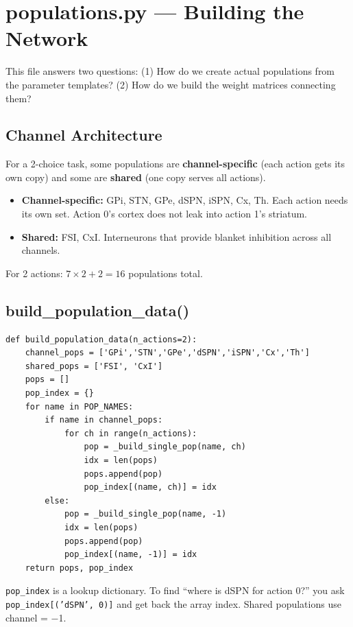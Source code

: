 \documentclass[11pt,a4paper]{article}
\begin{document}
\section{populations.py --- Building the Network}

This file answers two questions: (1) How do we create actual populations from the parameter templates? (2) How do we build the weight matrices connecting them?

\subsection{Channel Architecture}

For a 2-choice task, some populations are \textbf{channel-specific} (each action gets its own copy) and some are \textbf{shared} (one copy serves all actions).

\begin{itemize}
    \item \textbf{Channel-specific:} GPi, STN, GPe, dSPN, iSPN, Cx, Th. Each action needs its own set. Action 0's cortex does not leak into action 1's striatum.
    \item \textbf{Shared:} FSI, CxI. Interneurons that provide blanket inhibition across all channels.
\end{itemize}

For 2 actions: $7 \times 2 + 2 = 16$ populations total.

\subsection{build\_population\_data()}

\begin{lstlisting}
def build_population_data(n_actions=2):
    channel_pops = ['GPi','STN','GPe','dSPN','iSPN','Cx','Th']
    shared_pops = ['FSI', 'CxI']
    pops = []
    pop_index = {}
    for name in POP_NAMES:
        if name in channel_pops:
            for ch in range(n_actions):
                pop = _build_single_pop(name, ch)
                idx = len(pops)
                pops.append(pop)
                pop_index[(name, ch)] = idx
        else:
            pop = _build_single_pop(name, -1)
            idx = len(pops)
            pops.append(pop)
            pop_index[(name, -1)] = idx
    return pops, pop_index
\end{lstlisting}

\texttt{pop\_index} is a lookup dictionary. To find ``where is dSPN for action 0?'' you ask \texttt{pop\_index[('dSPN', 0)]} and get back the array index. Shared populations use channel = $-$1.
\end{document}
